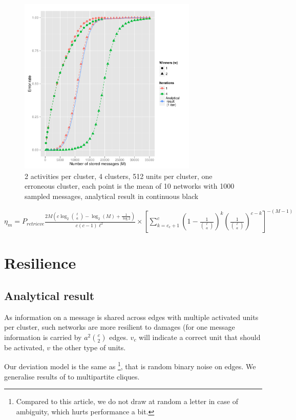 \documentclass[english,10pt,twocolumn]{IEEEtran}
\theoremstyle{definition}
\begin{document}
	\begin{figure}[!htb]
		\includegraphics[width=8.5cm]{Courbes/fig4c4l512a2e1corr}%
		\caption{2 activities per cluster, 4 clusters, 512 units per cluster, one erroneous cluster, each point is the mean of 10 networks with 1000 sampled messages, analytical result in continuous black}
		\label{corruptth}
	\end{figure}
		
		$\eta_m = P_{retrieve}  \frac{2 M\left(c \log_2{\ell \choose a } - \log_2(M) + \frac{1}{\log 2} \right)}{c(c-1)\ell^2} \times \left [\sum_{k = c_e+1}^{c} \left (1-\frac{1}{{\ell \choose a}} \right )^k \left (\frac{1}{{\ell \choose a}} \right )^{c-k} \right ] ^{-(M-1)}$
		
		

	
	\section{Resilience}
	\subsection{Analytical result}
	
	As information on a message is shared across edges with multiple activated units per cluster, such networks are more resilient to damages (for one message information is carried by $a^2 {c \choose 2}$ edges. $v_c$ will indicate a correct unit that should be activated, $v$ the other type of units.
	
	Our deviation model is the same as \cite{LedGriRabGro20145}\footnote{Compared to this article, we do not draw at random a letter in case of ambiguity, which hurts performance a bit.}, that is random binary noise on edges. We generalise results of \cite{LedGriRabGro20145} to multipartite cliques.
	
\end{document}
